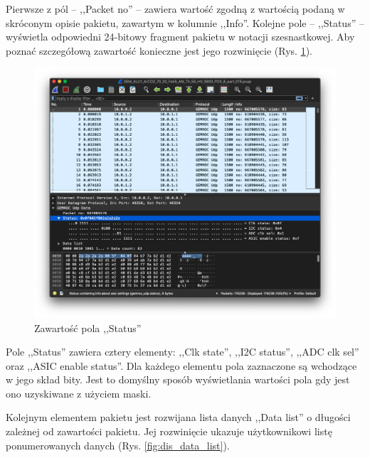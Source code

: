 \documentclass[a4paper, 11pt, twoside, openright]{article}
\begin{document}
	Pierwsze z pól -- ,,Packet no'' -- zawiera wartość zgodną z wartością podaną w skróconym opisie pakietu, zawartym w kolumnie ,,Info''. Kolejne pole -- ,,Status'' --
	wyświetla odpowiedni 24-bitowy fragment pakietu w notacji szesnastkowej. Aby poznać szczegółową zawartość konieczne jest jego rozwinięcie (Rys. \ref{fig:dis_status}).

		\begin{figure}[h]
			\centering
				\includegraphics[width=1.0\textwidth]{img/screenshot_dissector_status.png}
			\caption{Zawartość pola ,,Status''}
			\label{fig:dis_status}
		\end{figure}

	Pole ,,Status'' zawiera cztery elementy: ,,Clk state'', ,,I2C status'', ,,ADC clk sel'' oraz ,,ASIC enable status''. Dla każdego elementu
	pola zaznaczone są wchodzące w jego skład bity. Jest to domyślny sposób wyświetlania wartości pola gdy jest ono uzyskiwane z użyciem maski.

	Kolejnym elementem pakietu jest rozwijana lista danych ,,Data list'' o długości zależnej od zawartości pakietu. Jej rozwinięcie ukazuje użytkownikowi
	listę ponumerowanych danych (Rys. \ref{fig:dis_data_list}).
\end{document}
